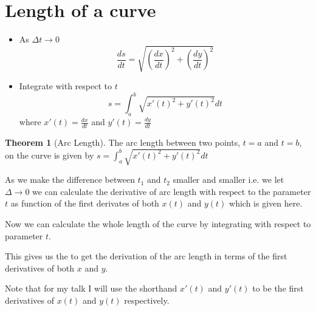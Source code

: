 \documentclass[]{article} %
\theoremstyle{definition}
\theoremstyle{theorem}
\newtheorem{theorem}{Theorem}[section]
\begin{document}
\section{Length of a curve}
\begin{tcolorbox}
	\begin{itemize}
	\item As $\Delta t \to 0$
	\[
		\frac{ds}{dt} = \sqrt{\left( \frac{dx}{dt} \right)^2 + \left( \frac{dy}{dt}\right)^2}
	\]
	\item Integrate with respect to $t$ 
	\[
	s =\int_{a}^{b} \sqrt{x'(t)^2 + y'(t)^2}dt
	\]
	where $x'(t) = \frac{dx}{dt}$ and $y'(t) = \frac{dy}{dt}$
	\end{itemize}
	\begin{theorem}[Arc Length]
		The arc length between two points, $t = a$ and $t = b$, on the curve is given by
		$s =\int_{a}^{b} \sqrt{x'(t)^2 + y'(t)^2}dt$
	\end{theorem}	
\end{tcolorbox}

As we make the difference between $t_1$ and $t_2$ smaller and smaller i.e. we let $\Delta \to 0$ we can calculate the derivative of arc length with respect to the parameter $t$ as function of the first derivates of both $x(t)$ and $y(t)$ which is given here.

Now we can calculate the whole length of the curve by integrating with respect to parameter $t$. 

This gives us the to get the derivation of the arc length in terms of the first derivatives of both $x$ and $y$. 

Note that for my talk I will use the shorthand $x'(t)$ and $y'(t)$ to be the first derivatives of $x(t)$ and $y(t)$ respectively.
\end{document}
